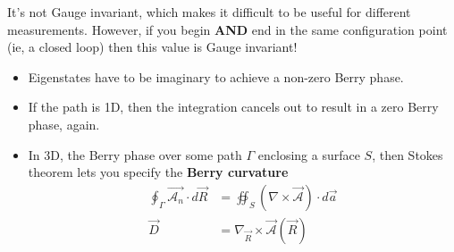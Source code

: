 \documentclass[../mattg_ti-fii_lit-review.tex]{subfiles}
\begin{document}
\begin{itemize}
			It's not Gauge invariant, which makes it difficult to be useful for different measurements. However, if you begin \textbf{AND} end in the same configuration point (ie, a closed loop) then this value is Gauge invariant!
			\begin{itemize}
				\item Eigenstates have to be imaginary to achieve a non-zero Berry phase.
				\item If the path is 1D, then the integration cancels out to result in a zero Berry phase, again.
				\item In 3D, the Berry phase over some path $\Gamma$ enclosing a surface $S$, then Stokes theorem lets you specify the \textbf{Berry curvature} 
				\begin{align}
					\oint_\Gamma \vec{\mathcal{A}_n}\cdot d\vec{R} &= \oiint_S \left(\nabla\times\vec{\mathcal{A}}\right)\cdot d\vec{a}\\
					\vec{D}&=\nabla_{\vec{R}}\times\vec{\mathcal{A}}(\vec{R})
				\end{align}
			\end{itemize}
	\end{itemize}
		
\end{document}
